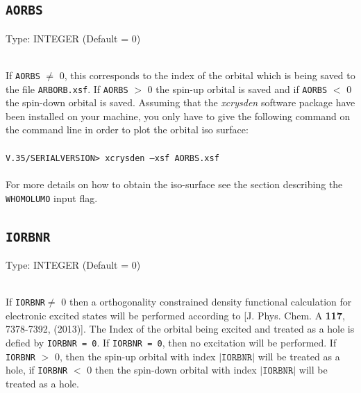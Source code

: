 \documentclass[a4paper,twoside,openany]{book}
\begin{document}
{{{{\subsection{\texttt{AORBS}} Type: INTEGER (Default = 0) }\\
If  \texttt{AORBS} $\ne$ 0, this corresponds to the  index of the orbital which is being saved to the file  \texttt{ARBORB.xsf}. If \texttt{AORBS} $>$ 0 the spin-up orbital is saved and
if \texttt{AORBS} $<$ 0 the spin-down orbital is saved. Assuming that the {\it xcrysden} software package have been installed on your machine, you only have to give the following command 
on the command line in order to plot the orbital iso surface: \\ \\
 \texttt{V.35/SERIALVERSION> xcrysden --xsf AORBS.xsf }
 \\ \\
For more details on how to obtain the iso-surface see the section describing the  \texttt{WHOMOLUMO} input flag.

\subsection{\texttt{IORBNR}} Type: INTEGER  (Default = 0) }\\
If  \texttt{IORBNR}$\ne$ 0 then a orthogonality constrained density functional calculation for electronic excited states will be performed according to [J. Phys. Chem. A {\bf 117}, 7378-7392,  (2013)]. The Index of the orbital being excited  and  treated as a hole
is defied by \texttt{IORBNR = 0}. If \texttt{IORBNR = 0}, then no excitation will be performed.
 If \texttt{IORBNR} $>$ 0, then the  spin-up orbital with index $|\texttt{IORBNR}|$ will be treated as a hole, if \texttt{IORBNR} $< $ 0 then the  spin-down orbital with index $|\texttt{IORBNR}|$ will be treated as a hole.


}}
\end{document}
